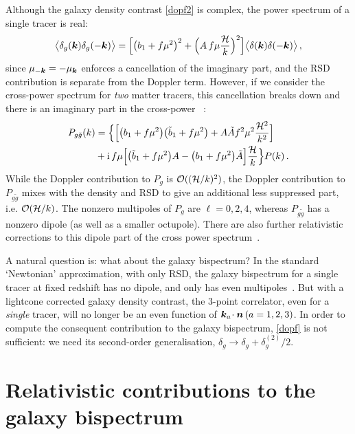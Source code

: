 Although the galaxy density contrast \eqref{dopf2} is complex, the power spectrum of a single tracer is real:
\begin{equation}
\big\langle \delta_g(\bm {k})\delta_g(-\bm {k})\big\rangle
=\Big[ \big(b_{1} + f\mu^{2}\big)^2+\Big(A\,f \mu \frac{\mathcal{H}}{k}\Big)^2\Big] \big\langle \delta(\bm {k})\delta(-\bm {k})\big\rangle \,,\nonumber
\end{equation}
since $\mu_{-\bm {k}}=-\mu_{\bm {k}}$ enforces a cancellation of the imaginary part, and the RSD contribution is separate from the Doppler term.
However, if we consider the cross-power spectrum for {\em two} matter tracers, this cancellation breaks down
and  there is an imaginary part in the cross-power~ \citep{McDonald:2009dh,Bonvin:2014owa}:
\begin{align}
P_{g \tilde g}(k)&= \Big\{\Big[ \big(b_{1} + f\mu^{2}\big)\big(\tilde b_{1} + f\mu^{2}\big)+A\tilde A f^2\mu^2 {\frac{\mathcal{H}^2}{k^2}}\Big]\nonumber\\
&
+\mathrm{i\,} f\mu\Big[\big(\tilde b_{1} + f\mu^{2}\big)A-\big(b_{1} + f\mu^{2}\big)\tilde A\Big]{\frac{\mathcal{H}}{k}} \Big\}P(k) \,.\nonumber
\end{align}
While the Doppler contribution to $P_g$ is $\mathcal{O}((\mathcal{H}/k)^{2})$,  the Doppler contribution to $P_{g\tilde g}$ mixes with the density and RSD to give an additional less suppressed part, i.e. $\mathcal{O}(\mathcal{H}/k)$. The nonzero multipoles of $P_g$ are $\ell=0,2,4$, whereas  $P_{g \tilde g}$ has a nonzero dipole (as well as a smaller octupole).  There are also further relativistic corrections to this dipole part of the cross power spectrum~\citep{DiDio:2018zmk}.


A natural question is: what about the galaxy bispectrum? In the standard `Newtonian' approximation, with only RSD, the galaxy bispectrum for a single tracer at fixed redshift has no dipole, and only has even multipoles~\citep{Scoccimarro:1999ed,Nan:2017oaq}. But
with a lightcone corrected galaxy density contrast, the 3-point correlator, even for a {\em single} tracer, will no longer be an even function of $\bm {k}_a\!\cdot\bm {n} \,(a=1,2,3)$. In order to compute the consequent contribution to the galaxy bispectrum, \eqref{dopf} is not sufficient: we need its second-order generalisation, $\delta_g \to \delta_g+\delta^{(2)}_g/2$.

\section{Relativistic contributions to the galaxy bispectrum}

